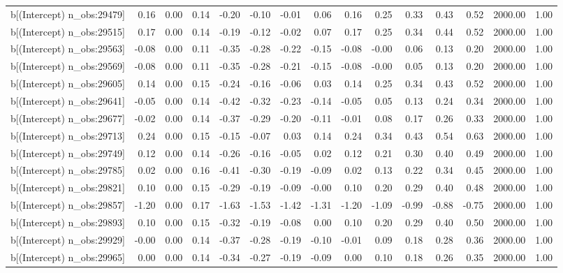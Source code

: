 \begin{table}[ht]
\begin{tabular}{rrrrrrrrrrrrrrr}
  b[(Intercept) n\_obs:29479] & 0.16 & 0.00 & 0.14 & -0.20 & -0.10 & -0.01 & 0.06 & 0.16 & 0.25 & 0.33 & 0.43 & 0.52 & 2000.00 & 1.00 \\ 
  b[(Intercept) n\_obs:29515] & 0.17 & 0.00 & 0.14 & -0.19 & -0.12 & -0.02 & 0.07 & 0.17 & 0.25 & 0.34 & 0.44 & 0.52 & 2000.00 & 1.00 \\ 
  b[(Intercept) n\_obs:29563] & -0.08 & 0.00 & 0.11 & -0.35 & -0.28 & -0.22 & -0.15 & -0.08 & -0.00 & 0.06 & 0.13 & 0.20 & 2000.00 & 1.00 \\ 
  b[(Intercept) n\_obs:29569] & -0.08 & 0.00 & 0.11 & -0.35 & -0.28 & -0.21 & -0.15 & -0.08 & -0.00 & 0.05 & 0.13 & 0.20 & 2000.00 & 1.00 \\ 
  b[(Intercept) n\_obs:29605] & 0.14 & 0.00 & 0.15 & -0.24 & -0.16 & -0.06 & 0.03 & 0.14 & 0.25 & 0.34 & 0.43 & 0.52 & 2000.00 & 1.00 \\ 
  b[(Intercept) n\_obs:29641] & -0.05 & 0.00 & 0.14 & -0.42 & -0.32 & -0.23 & -0.14 & -0.05 & 0.05 & 0.13 & 0.24 & 0.34 & 2000.00 & 1.00 \\ 
  b[(Intercept) n\_obs:29677] & -0.02 & 0.00 & 0.14 & -0.37 & -0.29 & -0.20 & -0.11 & -0.01 & 0.08 & 0.17 & 0.26 & 0.33 & 2000.00 & 1.00 \\ 
  b[(Intercept) n\_obs:29713] & 0.24 & 0.00 & 0.15 & -0.15 & -0.07 & 0.03 & 0.14 & 0.24 & 0.34 & 0.43 & 0.54 & 0.63 & 2000.00 & 1.00 \\ 
  b[(Intercept) n\_obs:29749] & 0.12 & 0.00 & 0.14 & -0.26 & -0.16 & -0.05 & 0.02 & 0.12 & 0.21 & 0.30 & 0.40 & 0.49 & 2000.00 & 1.00 \\ 
  b[(Intercept) n\_obs:29785] & 0.02 & 0.00 & 0.16 & -0.41 & -0.30 & -0.19 & -0.09 & 0.02 & 0.13 & 0.22 & 0.34 & 0.45 & 2000.00 & 1.00 \\ 
  b[(Intercept) n\_obs:29821] & 0.10 & 0.00 & 0.15 & -0.29 & -0.19 & -0.09 & -0.00 & 0.10 & 0.20 & 0.29 & 0.40 & 0.48 & 2000.00 & 1.00 \\ 
  b[(Intercept) n\_obs:29857] & -1.20 & 0.00 & 0.17 & -1.63 & -1.53 & -1.42 & -1.31 & -1.20 & -1.09 & -0.99 & -0.88 & -0.75 & 2000.00 & 1.00 \\ 
  b[(Intercept) n\_obs:29893] & 0.10 & 0.00 & 0.15 & -0.32 & -0.19 & -0.08 & 0.00 & 0.10 & 0.20 & 0.29 & 0.40 & 0.50 & 2000.00 & 1.00 \\ 
  b[(Intercept) n\_obs:29929] & -0.00 & 0.00 & 0.14 & -0.37 & -0.28 & -0.19 & -0.10 & -0.01 & 0.09 & 0.18 & 0.28 & 0.36 & 2000.00 & 1.00 \\ 
  b[(Intercept) n\_obs:29965] & 0.00 & 0.00 & 0.14 & -0.34 & -0.27 & -0.19 & -0.09 & 0.00 & 0.10 & 0.18 & 0.26 & 0.35 & 2000.00 & 1.00 \\ 

\end{tabular}
\end{table}
